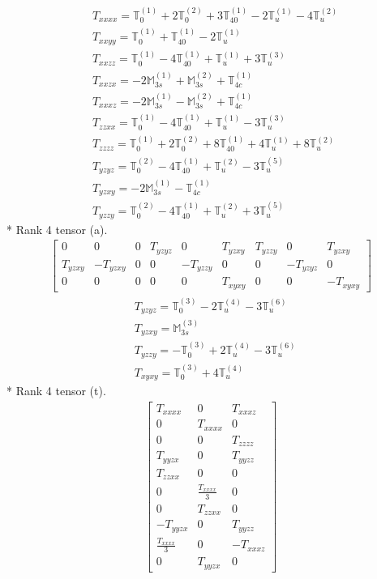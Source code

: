 \documentclass[fleqn,8pt,landscape]{jsarticle}
\begin{document}
\begin{align*}
& T_{xxxx} = \mathbb{T}_{0}^{(1)} + 2 \mathbb{T}_{0}^{(2)} + 3 \mathbb{T}_{40}^{(1)} - 2 \mathbb{T}_{u}^{(1)} - 4 \mathbb{T}_{u}^{(2)} \\
& T_{xxyy} = \mathbb{T}_{0}^{(1)} + \mathbb{T}_{40}^{(1)} - 2 \mathbb{T}_{u}^{(1)} \\
& T_{xxzz} = \mathbb{T}_{0}^{(1)} - 4 \mathbb{T}_{40}^{(1)} + \mathbb{T}_{u}^{(1)} + 3 \mathbb{T}_{u}^{(3)} \\
& T_{xxzx} = - 2 \mathbb{M}_{3s}^{(1)} + \mathbb{M}_{3s}^{(2)} + \mathbb{T}_{4c}^{(1)} \\
& T_{xxxz} = - 2 \mathbb{M}_{3s}^{(1)} - \mathbb{M}_{3s}^{(2)} + \mathbb{T}_{4c}^{(1)} \\
& T_{zzxx} = \mathbb{T}_{0}^{(1)} - 4 \mathbb{T}_{40}^{(1)} + \mathbb{T}_{u}^{(1)} - 3 \mathbb{T}_{u}^{(3)} \\
& T_{zzzz} = \mathbb{T}_{0}^{(1)} + 2 \mathbb{T}_{0}^{(2)} + 8 \mathbb{T}_{40}^{(1)} + 4 \mathbb{T}_{u}^{(1)} + 8 \mathbb{T}_{u}^{(2)} \\
& T_{yzyz} = \mathbb{T}_{0}^{(2)} - 4 \mathbb{T}_{40}^{(1)} + \mathbb{T}_{u}^{(2)} - 3 \mathbb{T}_{u}^{(5)} \\
& T_{yzxy} = - 2 \mathbb{M}_{3s}^{(1)} - \mathbb{T}_{4c}^{(1)} \\
& T_{yzzy} = \mathbb{T}_{0}^{(2)} - 4 \mathbb{T}_{40}^{(1)} + \mathbb{T}_{u}^{(2)} + 3 \mathbb{T}_{u}^{(5)}
\end{align*}
* Rank 4 tensor (a).
\begin{align*}
\begin{bmatrix} 0 & 0 & 0 & T_{yzyz} & 0 & T_{yzxy} & T_{yzzy} & 0 & T_{yzxy} \\ T_{yzxy} & - T_{yzxy} & 0 & 0 & - T_{yzzy} & 0 & 0 & - T_{yzyz} & 0 \\ 0 & 0 & 0 & 0 & 0 & T_{xyxy} & 0 & 0 & - T_{xyxy} \end{bmatrix}
\end{align*}
\begin{align*}
& T_{yzyz} = \mathbb{T}_{0}^{(3)} - 2 \mathbb{T}_{u}^{(4)} - 3 \mathbb{T}_{u}^{(6)} \\
& T_{yzxy} = \mathbb{M}_{3s}^{(3)} \\
& T_{yzzy} = - \mathbb{T}_{0}^{(3)} + 2 \mathbb{T}_{u}^{(4)} - 3 \mathbb{T}_{u}^{(6)} \\
& T_{xyxy} = \mathbb{T}_{0}^{(3)} + 4 \mathbb{T}_{u}^{(4)}
\end{align*}
* Rank 4 tensor (t).
\begin{align*}
\begin{bmatrix} T_{xxxx} & 0 & T_{xxxz} \\ 0 & T_{xxxx} & 0 \\ 0 & 0 & T_{zzzz} \\ T_{yyzx} & 0 & T_{yyzz} \\ T_{zzxx} & 0 & 0 \\ 0 & \frac{T_{xxxx}}{3} & 0 \\ 0 & T_{zzxx} & 0 \\ - T_{yyzx} & 0 & T_{yyzz} \\ \frac{T_{xxxx}}{3} & 0 & - T_{xxxz} \\ 0 & T_{yyzx} & 0 \end{bmatrix}
\end{align*}
\end{document}
